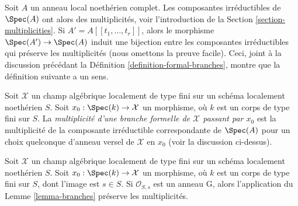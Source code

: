 \noindent
Soit $A$ un anneau local noethérien complet. Les composantes
irréductibles de $\Spec(A)$ ont alors des multiplicités, voir
l'introduction de la Section \ref{section-multiplicities}.
Si $A' = A[[t_1, \ldots, t_r]]$, alors le morphisme
$\Spec(A') \to \Spec(A)$ induit une bijection entre les composantes
irréductibles qui préserve les multiplicités (nous omettons la preuve facile).
Ceci, joint à la discussion précédant la
Définition \ref{definition-formal-branches},
montre que la définition suivante a un sens.

\begin{definition}
\label{definition-multiplicity-formal-branches}
Soit $\mathcal{X}$ un champ algébrique localement de type fini
sur un schéma localement noethérien $S$. Soit $x_0 : \Spec(k) \to \mathcal{X}$
un morphisme, où $k$ est un corps de type fini sur $S$.
La {\it multiplicité d'une branche formelle de $\mathcal{X}$ passant par $x_0$}
est la multiplicité de la composante irréductible correspondante de
$\Spec(A)$ pour un choix quelconque d'anneau versel de $\mathcal{X}$ en $x_0$
(voir la discussion ci-dessus).
\end{definition}

\begin{lemma}
\label{lemma-branches-multiplicity}
Soit $\mathcal{X}$ un champ algébrique localement de type fini
sur un schéma localement noethérien $S$. Soit $x_0 : \Spec(k) \to \mathcal{X}$
un morphisme, où $k$ est un corps de type fini sur $S$, dont
l'image est $s \in S$. Si $\mathcal{O}_{S, s}$ est un anneau G, alors
l'application du Lemme \ref{lemma-branches} préserve les multiplicités.
\end{lemma}


